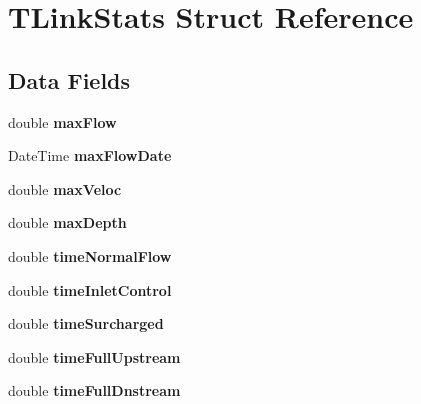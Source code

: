 \hypertarget{struct_t_link_stats}{}\section{T\+Link\+Stats Struct Reference}
\label{struct_t_link_stats}
\subsection*{Data Fields}
\begin{DoxyCompactItemize}
\item 
\mbox{\label{struct_t_link_stats_a50e437bc9d75ebd303d3e48e56416ad3}} 
double {\bfseries max\+Flow}
\item 
\mbox{\label{struct_t_link_stats_addcdfbfc5cfa090b68f1036a13f38483}} 
Date\+Time {\bfseries max\+Flow\+Date}
\item 
\mbox{\label{struct_t_link_stats_a59bd89d26a7fe7b29ae48cf9353fd051}} 
double {\bfseries max\+Veloc}
\item 
\mbox{\label{struct_t_link_stats_a6a4fdafe2923ec0b425ce0041a23119b}} 
double {\bfseries max\+Depth}
\item 
\mbox{\label{struct_t_link_stats_aded12dcc4297155e19d80a9ee7498aeb}} 
double {\bfseries time\+Normal\+Flow}
\item 
\mbox{\label{struct_t_link_stats_ae63b89b581674f9dc0bc5c2e02a3b6ce}} 
double {\bfseries time\+Inlet\+Control}
\item 
\mbox{\label{struct_t_link_stats_a5fb251ab511b532ceef472c2c81bd67f}} 
double {\bfseries time\+Surcharged}
\item 
\mbox{\label{struct_t_link_stats_af4fcdf636e5b8c0b03d4adb2b265a68b}} 
double {\bfseries time\+Full\+Upstream}
\item 
\mbox{\label{struct_t_link_stats_a2683ab8a511a2c35b076645dd2d694ac}} 
double {\bfseries time\+Full\+Dnstream}
\item 
\mbox{\label{struct_t_link_stats_a97137cb0f45846befe4ad8c779e47183}} 

\end{DoxyCompactItemize}
